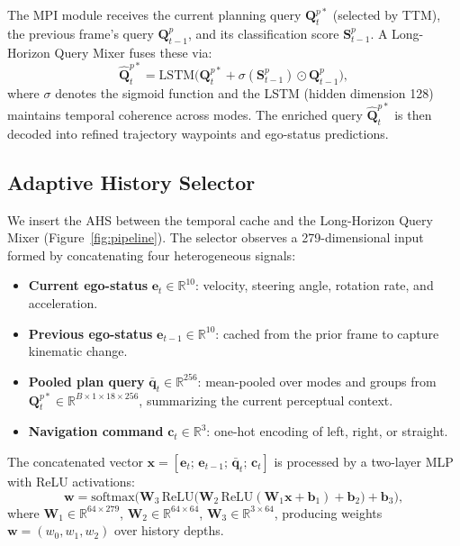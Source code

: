 \documentclass{article}
\begin{document}
The MPI module receives the current planning query $\mathbf{Q}_t^{p*}$ (selected by TTM), the previous frame's query $\mathbf{Q}_{t-1}^p$, and its classification score $\mathbf{S}_{t-1}^p$.
A Long-Horizon Query Mixer fuses these via:
\begin{equation}
    \hat{\mathbf{Q}}_t^{p*} = \text{LSTM}\!\Big(\mathbf{Q}_t^{p*} + \sigma(\mathbf{S}_{t-1}^p) \odot \mathbf{Q}_{t-1}^p\Big),
    \label{eq:mixer}
\end{equation}
where $\sigma$ denotes the sigmoid function and the LSTM (hidden dimension 128) maintains temporal coherence across modes.
The enriched query $\hat{\mathbf{Q}}_t^{p*}$ is then decoded into refined trajectory waypoints and ego-status predictions.

\subsection{Adaptive History Selector}
\label{sec:ahs}

We insert the AHS between the temporal cache and the Long-Horizon Query Mixer (Figure~\ref{fig:pipeline}).
The selector observes a 279-dimensional input formed by concatenating four heterogeneous signals:

\begin{itemize}
    \item \textbf{Current ego-status} $\mathbf{e}_t \in \mathbb{R}^{10}$: velocity, steering angle, rotation rate, and acceleration.
    \item \textbf{Previous ego-status} $\mathbf{e}_{t-1} \in \mathbb{R}^{10}$: cached from the prior frame to capture kinematic change.
    \item \textbf{Pooled plan query} $\bar{\mathbf{q}}_t \in \mathbb{R}^{256}$: mean-pooled over modes and groups from $\mathbf{Q}_t^{p*} \in \mathbb{R}^{B \times 1 \times 18 \times 256}$, summarizing the current perceptual context.
    \item \textbf{Navigation command} $\mathbf{c}_t \in \mathbb{R}^{3}$: one-hot encoding of left, right, or straight.
\end{itemize}

The concatenated vector $\mathbf{x} = [\mathbf{e}_t;\, \mathbf{e}_{t-1};\, \bar{\mathbf{q}}_t;\, \mathbf{c}_t]$ is processed by a two-layer MLP with ReLU activations:
\begin{equation}
    \mathbf{w} = \mathrm{softmax}\!\Big(\mathbf{W}_3\,\mathrm{ReLU}\!\big(\mathbf{W}_2\,\mathrm{ReLU}(\mathbf{W}_1 \mathbf{x} + \mathbf{b}_1) + \mathbf{b}_2\big) + \mathbf{b}_3\Big),
    \label{eq:gate}
\end{equation}
where $\mathbf{W}_1 \in \mathbb{R}^{64 \times 279}$, $\mathbf{W}_2 \in \mathbb{R}^{64 \times 64}$, $\mathbf{W}_3 \in \mathbb{R}^{3 \times 64}$, producing weights $\mathbf{w} = (w_0, w_1, w_2)$ over history depths.
\end{document}
